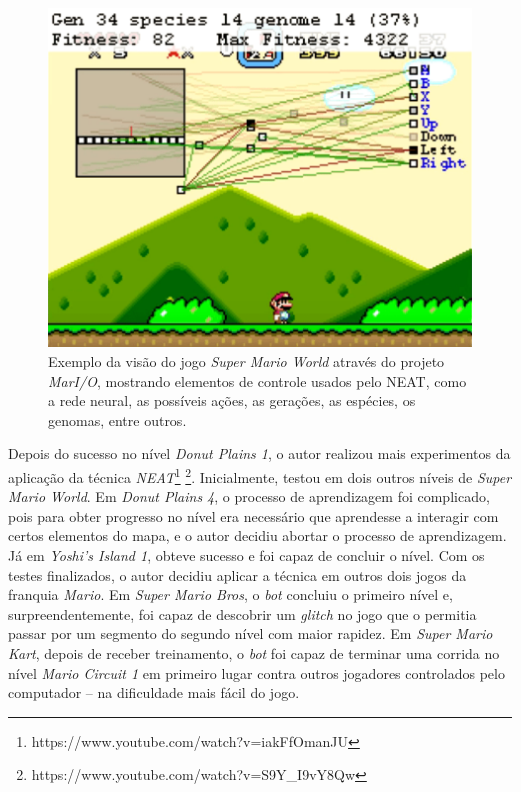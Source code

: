 \begin{figure}[htb!]
\centering
\includegraphics[width=.65\textwidth]{fig/mar-io-example.pdf}
\caption{\label{fig:mar-io-example}Exemplo da visão do jogo \textit{Super
Mario World} através do projeto \textit{MarI/O}, mostrando elementos de
controle usados pelo NEAT, como a rede neural, as possíveis ações, as
gerações, as espécies, os genomas, entre outros.}
\end{figure}

Depois do sucesso no nível \textit{Donut Plains 1}, o autor realizou mais
experimentos da aplicação da técnica
\textit{NEAT}\footnote{https://www.youtube.com/watch?v=iakFfOmanJU}
\footnote{https://www.youtube.com/watch?v=S9Y\_I9vY8Qw}. Inicialmente, testou em
dois outros níveis de \textit{Super Mario World}. Em \textit{Donut Plains 4}, o
processo de aprendizagem foi complicado, pois para obter progresso no nível era
necessário que aprendesse a interagir com certos elementos do mapa, e o autor
decidiu abortar o processo de aprendizagem. Já em \textit{Yoshi's Island 1},
obteve sucesso e foi capaz de concluir o nível. Com os testes finalizados, o
autor decidiu aplicar a técnica em outros dois jogos da franquia \textit{Mario}.
Em \textit{Super Mario Bros}, o \textit{bot} concluiu o primeiro nível e,
surpreendentemente, foi capaz de descobrir um \textit{glitch} no jogo que o
permitia passar por um segmento do segundo nível com maior rapidez. Em
\textit{Super Mario Kart}, depois de receber treinamento, o \textit{bot} foi
capaz de terminar uma corrida no nível \textit{Mario Circuit 1} em primeiro
lugar contra outros jogadores controlados pelo computador -- na dificuldade mais
fácil do jogo.


